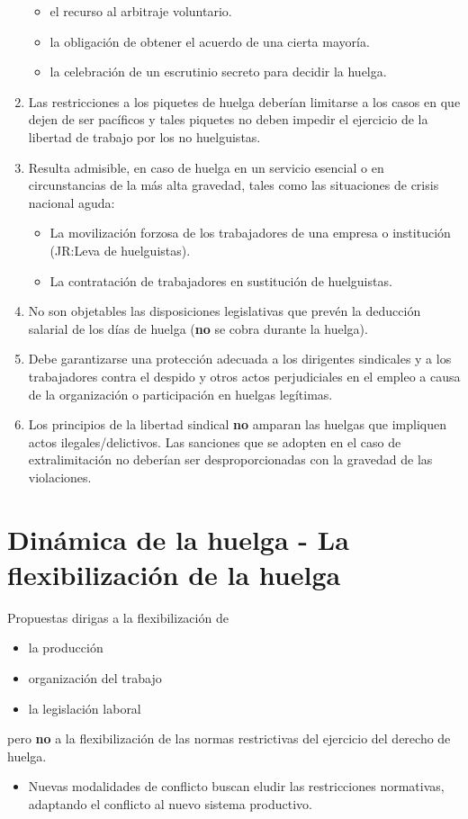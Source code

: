\documentclass[spanish,12pt,a4paper,titlepage]{report}
\begin{document}
\begin{enumerate}
\begin{itemize}
  \item el recurso al arbitraje voluntario.
  \item la obligación de obtener el acuerdo de una cierta mayoría.
  \item la celebración de un escrutinio secreto para decidir la huelga.
  \end{itemize}
\item Las restricciones a los piquetes de huelga deberían limitarse a los casos en que dejen de ser pacíficos y tales piquetes no deben impedir el ejercicio de la libertad de trabajo por los no huelguistas.
\item Resulta admisible, en caso de huelga en un servicio esencial o en circunstancias de la más alta gravedad, tales como las situaciones de crisis nacional aguda:
  \begin{itemize}
  \item La movilización forzosa de los trabajadores de una empresa o institución (JR:Leva de huelguistas).
  \item La contratación de trabajadores en sustitución de huelguistas.
  \end{itemize}
\item No son objetables las disposiciones legislativas que prevén la deducción salarial de los días de huelga (\textbf{no} se cobra durante la huelga).
\item Debe garantizarse una protección adecuada a los dirigentes sindicales y a los trabajadores contra el despido y otros actos perjudiciales en el empleo a causa de la organización o participación en huelgas legítimas.
\item Los principios de la libertad sindical \textbf{no} amparan las huelgas que impliquen actos ilegales/delictivos. Las sanciones que se adopten en el caso de extralimitación no deberían ser desproporcionadas con la gravedad de las violaciones.
\end{enumerate}

\chapter{Dinámica de la huelga - La flexibilización de la huelga}
\label{chap:Dinamica-de-la-huelga}

Propuestas dirigas a la flexibilización de
\begin{itemize}
\item la producción
\item organización del trabajo
\item la legislación laboral
\end{itemize}
pero \textbf{no} a la flexibilización de las normas restrictivas del ejercicio del derecho de huelga.
\begin{itemize}
\item Nuevas modalidades de conflicto buscan eludir las restricciones normativas, adaptando el conflicto al nuevo sistema productivo.
\end{itemize}
\end{document}
